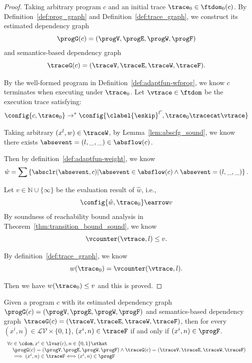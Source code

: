 \begin{proof}
Taking arbitrary program $c$ and an initial trace $\trace_0 \in \ftdom_0(c)$.
By Definition~\ref{def:prog_graph} and Definition~\ref{def:trace_graph}, 
we construct
its estimated dependency graph 
$$\progG({c}) = (\progV, \progE, \progW, \progF)$$
and 
semantics-based dependency graph 
$$\traceG({c}) = (\traceV, \traceE, \traceW, \traceF).$$

By the well-formed program in Definition~\ref{def:adaptfun-wfprog}, we know $c$ terminates when executing under $\trace_0$.
Let $\vtrace \in \ftdom$ be the execution trace satisfying:
$$
\config{{c}, \trace_0} \to^{*} \config{\clabel{\eskip}^{l'}, \trace_0\tracecat\vtrace} 
$$

Taking
arbitrary 
$(x^l, w) \in \traceW$,
by Lemma~\ref{lem:abscfg_sound},
we know there exists $\absevent = (l, \_, \_) \in \absflow(c)$.

Then by definition~\ref{def:adaptfun-weight}, we know 
\[
	\hat{w} = \sum\left\{  \absclr(\absevent, c) \middle\vert \absevent \in \absflow(c) \land \absevent = (l, \_, \_) \right\}.
\]

Let 
$v \in \mathbb{N} \cup\{ \infty\}$ be the evaluation result of $\hat{w}$, i.e.,
 \[
\config{\hat{w}, \trace_0} \earrow v
\]
By soundness of reachability bound analysis in Theorem~\ref{thm:transition_bound_sound}, we know 
\[\vcounter(\vtrace, l) \leq v .\]

By definition~\ref{def:trace_graph}, we know 
$$w(\trace_0) = \vcounter(\vtrace, l).$$

Then we have $w(\trace_0) \leq v$ and this is proved.
\end{proof}
%
\begin{lem}
	\label{lem:queryvertex_map}
	Given a program $c$ with its
	estimated dependency graph $\progG({c}) = (\progV, \progE, \progW, \progF)$
	and 
	semantics-based dependency graph $\traceG({c}) = (\traceV, \traceE, \traceW, \traceF)$,
	then for every $(x^i, n) \in \mathcal{LV}  \times \{0, 1\} $,
	 $(x^i, n) \in \traceF$ if and only if $ (x^i, n) \in \progF$.
	\[
	\begin{array}{l}
	\forall c \in \cdom , x^i \in \lvar(c), n \in \{0, 1\} 
	 \sthat  
	 \\ \quad
	 \progG({c}) = (\progV, \progE, \progW, \progF)
	\land 
	\traceG({c}) = (\traceV, \traceE, \traceW, \traceF)
	\\ \quad
	\implies
	(x^i, n) \in \traceF \Longleftrightarrow  (x^i, n) \in \progF
	\end{array}
	\]
	\end{lem}
